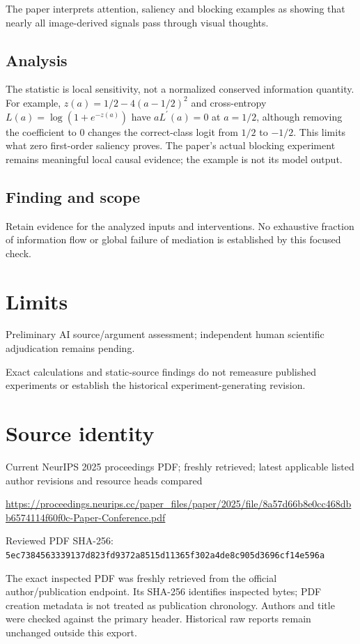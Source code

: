 \documentclass[11pt]{article}
\begin{document}
The paper interprets attention, saliency and blocking examples as showing that nearly all image-derived signals pass through visual thoughts.

\subsection*{Analysis}

The statistic is local sensitivity, not a normalized conserved information quantity. For example, \(z(a)=1/2-4(a-1/2)^2\) and cross-entropy \(L(a)=\log(1+e^{-z(a)})\) have \(aL^{\prime}(a)=0\) at \(a=1/2\), although removing the coefficient to \(0\) changes the correct-class logit from \(1/2\) to \(-1/2\). This limits what zero first-order saliency proves. The paper’s actual blocking experiment remains meaningful local causal evidence; the example is not its model output.

\subsection*{Finding and scope}

Retain evidence for the analyzed inputs and interventions. No exhaustive fraction of information flow or global failure of mediation is established by this focused check.

\section*{Limits}

Preliminary AI source/argument assessment; independent human scientific adjudication remains pending.\par

Exact calculations and static-source findings do not remeasure published experiments or establish the historical experiment-generating revision.\par

\section*{Source identity}

Current NeurIPS 2025 proceedings PDF; freshly retrieved; latest applicable listed author revisions and resource heads compared

\url{https://proceedings.neurips.cc/paper_files/paper/2025/file/8a57d66b8e0cc468dbb6574114f60f0c-Paper-Conference.pdf}

Reviewed PDF SHA-256: \nolinkurl{5ec7384563339137d823fd9372a8515d11365f302a4de8c905d3696cf14e596a}

The exact inspected PDF was freshly retrieved from the official author/publication endpoint. Its SHA-256 identifies inspected bytes; PDF creation metadata is not treated as publication chronology. Authors and title were checked against the primary header. Historical raw reports remain unchanged outside this export.
\end{document}

